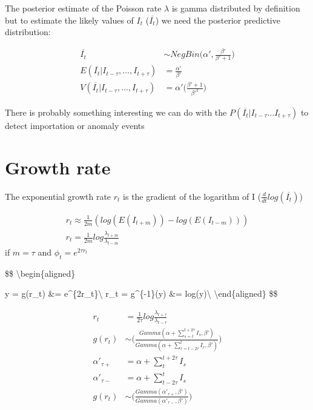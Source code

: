 \documentclass[
]{article}
\begin{document}
The posterior estimate of the Poisson rate \(\lambda\) is gamma
distributed by definition but to estimate the likely values of \(I_t\)
(\(\overline{I_t}\)) we need the posterior predictive distribution:

\[
\begin{aligned}
\overline{I_t} &\sim NegBin\Big(\alpha',\frac{\beta'}{\beta'+1}\Big)\\
E(\overline{I_t}|I_{t-\tau},\dots,I_{t+\tau}) &= \frac{\alpha'}{\beta'} \\
V(\overline{I_t}|I_{t-\tau},\dots,I_{t+\tau}) &= \alpha'\Big(\frac{\beta'+1}{\beta'^2}\Big)
\end{aligned}
\]

There is probably something interesting we can do with the
\(P(\overline{I_t}|I_{t-\tau} \dots I_{t+\tau})\) to detect importation
or anomaly events

\hypertarget{growth-rate}{%
\section{Growth rate}\label{growth-rate}}

The exponential growth rate \(r_t\) is the gradient of the logarithm of
I (\(\frac{d}{dt}log(\overline{I_t})\))

\[
\begin{aligned}
r_t \approx \frac{1}{2m}(log(E(I_{t+m}))-log(E(I_{t-m}))) \\
r_t = \frac{1}{2m}log\frac{\lambda_{t+m}}{\lambda_{t-m}}
\end{aligned}
\] if \(m = \tau\) and \(\phi_t = e^{2\tau r_t}\)

\$\$ \textbackslash begin\{aligned\}

y = g(r\_t) \&= e\^{}\{2\tau r\_t\}\textbackslash{} r\_t =
g\^{}\{-1\}(y) \&= log(y)\textbackslash{}
\textbackslash end\{aligned\} \$\$

\[
\begin{aligned}
r_t &= \frac{1}{2\tau}log\frac{\lambda_{t+\tau}}{\lambda_{t-\tau}} \\
g(r_t) &\sim \Bigg(\frac{Gamma(\alpha+\sum_{s=t}^{t+2\tau}{I_s}, \beta')}{Gamma(\alpha+\sum_{r=t-2\tau}^{t}{I_r}, \beta')}\Bigg) \\
\alpha'_{\tau+} &= \alpha+\sum_{t}^{t+2\tau}{I_s}\\
\alpha'_{\tau-} &= \alpha+\sum_{t-2\tau}^{t}{I_s}\\
g(r_t) &\sim \Bigg(\frac{
Gamma(\alpha'_{\tau+}, \beta')
}{
Gamma(\alpha'_{\tau-}, \beta')
}
\Bigg)\\
\end{aligned}
\]
\end{document}
